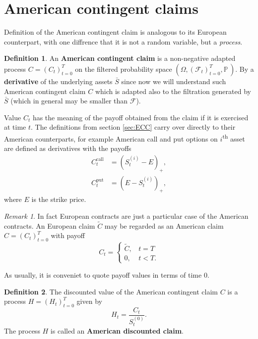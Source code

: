 \documentclass[a4paper,11pt, twoside]{book}
\theoremstyle{definition}
\newtheorem{mydef}{Definition}[chapter]
\theoremstyle{remark}
\newtheorem{remark}{Remark}[chapter]
\def\P{{\mathbb{P}}\,}
\def\Sa{\bar{S}}
\begin{document}
\section{American contingent claims}
Definition of the American contingent claim is analogous to its European counterpart, with one diffrence that it is not a random variable, but a \emph{process}.
\begin{mydef}
 \label{def:cc_am}
 An \textbf{American contingent claim} is a non-negative adapted process $C = (C_t)_{t=0}^T$ on the filtered probability space $(\Omega, (\mathcal{F}_t)_{t=0}^T, \P)$.
By a \textbf{derivative} of the underlying assets $\Sa$ since now we will understand such American contingent claim $C$ which is adapted also to the filtration generated by $\Sa$ (which in general may be smaller than $\mathcal{F}$).
\end{mydef}
Value $C_t$ has the meaning of the payoff obtained from the claim if it is exercised at time $t$. The definitions from section \ref{sec:ECC} carry over directly to their American counterparts, for example American call and put options on $i$\textsuperscript{th} asset are defined as derivatives with the payoffs
\begin{equation*}
 \begin{split}
  C^{\text{call}}_t &= (S^{(i)}_t - E)_+, \\
  C^{\text{put}}_t &= (E - S^{(i)}_t)_+,
 \end{split}
\end{equation*}
where $E$ is the strike price.
\begin{remark}
 In fact European contracts are just a particular case of the American contracts. An European claim $\tilde{C}$ may be regarded as an American claim $C = (C_t)_{t=0}^T$ with payoff
 \[ C_t = \begin{cases}
         \tilde{C},\ \ \ \ t = T \\
         0,\ \ \ \ \ t < T.
        \end{cases}
        \]
\end{remark}

As usually, it is conveniet to quote payoff values in terms of time 0.
\begin{mydef}
 The discounted value of the American contingent claim $C$ is a process $H = (H_t)_{t=0}^T$ given by
 \begin{equation*}
  H_t = \frac{C_t}{S^{(0)}_t}.
 \end{equation*}
 The process $H$ is called an \textbf{American discounted claim}.
\end{mydef}
\end{document}
